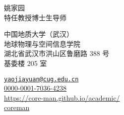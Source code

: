 \documentclass[11pt,a4paper]{article}
\makeatletter
\newcommand{\Name}{姚家园}
\newcommand{\Role}{特任教授\hspace{0.5em}博士生导师}
\newcommand{\Email}{yaojiayuan@cug.edu.cn}
\newcommand{\Website}{https://core-man.github.io/academic/}
\newcommand{\Github}{coreman}
\newcommand{\Orcid}{0000-0001-7036-4238}
\newcommand{\Affiliation}{中国地质大学（武汉）\\ 地球物理与空间信息学院}
\newcommand{\Address}{湖北省武汉市洪山区鲁磨路 388 号\\ 基委楼 205 室}
\makeatother
\begin{document}
\thispagestyle{empty} %
\begin{center}
\kaishu
{\fontsize{24pt}{0}\selectfont \Name \hspace{1ex}} \\[0.4cm]
{\fontsize{16pt}{0}\selectfont \Role} \\[0.2cm]
\end{center}
\begin{minipage}[t]{0.7\textwidth}
  \kaishu
  \fontsize{12pt}{15pt}\selectfont
  \Affiliation
  \\
  \Address
\end{minipage}
\begin{minipage}[t]{0.3\textwidth}
  \kaishu
  \fontsize{12pt}{15pt}\selectfont
  \begin{flushleft}
    \faEnvelope \href{mailto:\Email}{\texttt{\Email}}
	\\
	\faOrcid \href{https://orcid.org/\Orcid}{\Orcid}
	\\
    \faGlobe \href{https://\Website}{\Website}
	\\
	\faGithub \href{https://github.com/\Github}{\Github}
  \end{flushleft}
\end{minipage}
\vspace{0.2cm}












\end{document}
